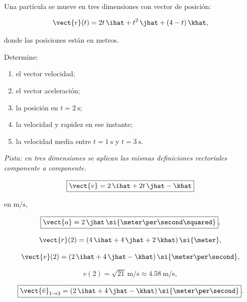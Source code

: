 \begin{ejercicio}
Una partícula se mueve en tres dimensiones con vector de posición:

\[
\vect{r}(t)
=
2t\,\ihat
+
t^2\,\jhat
+
(4-t)\,\khat,
\]

donde las posiciones están en metros.

Determine:

\begin{enumerate}[label=\alph*)]
    \item el vector velocidad;
    \item el vector aceleración;
    \item la posición en \(t=\SI{2}{\second}\);
    \item la velocidad y rapidez en ese instante;
    \item la velocidad media entre \(t=\SI{1}{\second}\) y \(t=\SI{3}{\second}\).
\end{enumerate}

\textit{Pista: en tres dimensiones se aplican las mismas definiciones vectoriales componente a componente.}
\end{ejercicio}

\begin{respuesta}
\[
\boxed{
\vect{v}
=
2\,\ihat+2t\,\jhat-\khat
}
\]

en \(\si{\meter\per\second}\),

\[
\boxed{
\vect{a}
=
2\,\jhat\,
\si{\meter\per\second\squared}
},
\]

\[
\vect{r}(2)
=
(4\,\ihat+4\,\jhat+2\,\khat)\,\si{\meter},
\]

\[
\vect{v}(2)
=
(2\,\ihat+4\,\jhat-\khat)\,
\si{\meter\per\second},
\]

\[
\boxed{
v(2)
=
\sqrt{21}\,\si{\meter\per\second}
\approx
\SI{4.58}{\meter\per\second}
},
\]

\[
\boxed{
\vect{\bar{v}}_{1\to3}
=
(2\,\ihat+4\,\jhat-\khat)\,
\si{\meter\per\second}
}.
\]
\end{respuesta}


